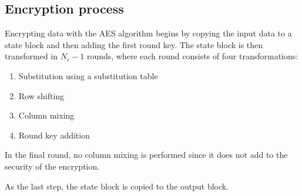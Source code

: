 \documentclass[report.tex]{subfiles}
\begin{document}
\subsection{Encryption process} \label{sec:encryption process}
Encrypting data with the AES algorithm begins by copying the input data to a state block and then adding the first round key. The state block is then transformed in $N_r-1$ rounds, where each round consists of four transformations:
\begin{enumerate}
\item Substitution using a substitution table
\item Row shifting
\item Column mixing
\item Round key addition
\end{enumerate}
In the final round, no column mixing is performed since it does not add to the security of the encryption.

As the last step, the state block is copied to the output block.
\end{document}
